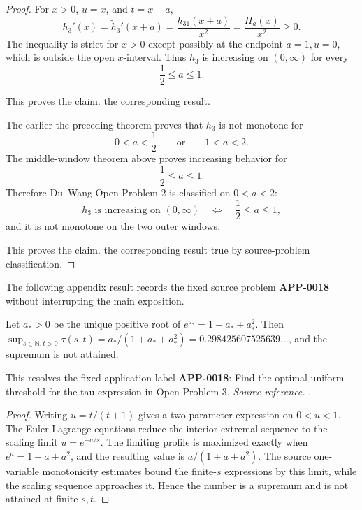 \begin{proof}
For \(x>0\), \(u=x\), and \(t=x+a\),
\[
h_3'(x)=\widetilde h_3'(x+a)=\frac{h_{31}(x+a)}{x^2}
=\frac{H_a(x)}{x^2}\ge0.
\]
The inequality is strict for \(x>0\) except possibly at the endpoint
\(a=1,u=0\), which is outside the open \(x\)-interval.  Thus \(h_3\) is
increasing on \((0,\infty)\) for every
\[
\frac12\le a\le1.
\]

This proves the claim.
the corresponding result.

The earlier the preceding theorem proves that
\(h_3\) is not monotone for
\[
0<a<\frac12
\qquad\text{or}\qquad
1<a<2.
\]
The middle-window theorem above proves increasing behavior for
\[
\frac12\le a\le1.
\]
Therefore Du--Wang Open Problem 2 is classified on \(0<a<2\):
\[
h_3 \text{ is increasing on }(0,\infty)
\quad\Longleftrightarrow\quad
\frac12\le a\le1,
\]
and it is not monotone on the two outer windows.

This proves the claim.
the corresponding result true by source-problem classification.
\end{proof}

The following appendix result records the fixed source problem \textbf{APP-0018} without interrupting the main exposition.
\begin{corollary}
\label{res:qg-tau-global-supremum}
Let \(a_*>0\) be the unique positive root of \(e^{a_*}=1+a_*+a_*^2\). Then \(\sup_{s\in\mathbb N,t>0}\tau(s,t)=a_*/(1+a_*+a_*^2)=0.298425607525639\ldots\), and the supremum is not attained.

This resolves the fixed application label \textbf{APP-0018}: Find the optimal uniform threshold for the tau expression in Open Problem 3.
\emph{Source reference.} \cite{app-app-0018-source}.
\end{corollary}
\begin{proof}
Writing \(u=t/(t+1)\) gives a two-parameter expression on \(0<u<1\).  The
Euler-Lagrange equations reduce the interior extremal sequence to the scaling
limit \(u=e^{-a/s}\).  The limiting profile is maximized exactly when
\(e^a=1+a+a^2\), and the resulting value is \(a/(1+a+a^2)\).  The source
one-variable monotonicity estimates bound the finite-\(s\) expressions by this
limit, while the scaling sequence approaches it.  Hence the number is a
supremum and is not attained at finite \(s,t\).
\end{proof}

